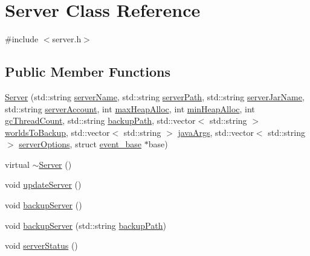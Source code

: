 \hypertarget{class_server}{}\section{Server Class Reference}
\label{class_server}


{\ttfamily \#include $<$server.\+h$>$}

\subsection*{Public Member Functions}
\begin{DoxyCompactItemize}
\item 
\hyperlink{class_server_a8613abefade901e8f3ae2a028ab985f0}{Server} (std\+::string \hyperlink{class_server_aa96465f7e42dc0a43997e80aa002f5dc}{server\+Name}, std\+::string \hyperlink{class_server_a3435a7c091cb1184892e0a8a89838aa8}{server\+Path}, std\+::string \hyperlink{class_server_a00fa649de7a3b16e3884e7f0edb01cbc}{server\+Jar\+Name}, std\+::string \hyperlink{class_server_a1e9675de0f07622b12fa6848bc2d24b2}{server\+Account}, int \hyperlink{class_server_af2edab4046d3ca9525dc117582b1efa5}{max\+Heap\+Alloc}, int \hyperlink{class_server_ab572c4b5477a4dcfdf264e9fcb5b9f82}{min\+Heap\+Alloc}, int \hyperlink{class_server_a3586f498f31d9b52f122b48dff5bebb8}{gc\+Thread\+Count}, std\+::string \hyperlink{class_server_a5519da36a05003e5b724f6c0ae6a80a0}{backup\+Path}, std\+::vector$<$ std\+::string $>$ \hyperlink{class_server_ac0981101c974ac4173f98c3d2b9adc20}{worlds\+To\+Backup}, std\+::vector$<$ std\+::string $>$ \hyperlink{class_server_a97edc18388a8b8c94193dabfdadcf389}{java\+Args}, std\+::vector$<$ std\+::string $>$ \hyperlink{class_server_a955aa6e6e4f11b3809db65a16f16f14e}{server\+Options}, struct \hyperlink{class_server_afd7e0781dcfb8315807e3b173f84d8a9}{event\+\_\+base} $\ast$base)
\item 
virtual \hyperlink{class_server_a4b3aa2579cb1c8cd1d069582c14d0fa6}{$\sim$\+Server} ()
\item 
void \hyperlink{class_server_a1735675f39611edc89fc6363446c393c}{update\+Server} ()
\item 
void \hyperlink{class_server_a1c24b1f9b8b8ac513382ae0e7ba229eb}{backup\+Server} ()
\item 
void \hyperlink{class_server_ab16d98a8889b690225f65aee757b5998}{backup\+Server} (std\+::string \hyperlink{class_server_a5519da36a05003e5b724f6c0ae6a80a0}{backup\+Path})
\item 
void \hyperlink{class_server_aaa084c42dc896c290a30b685305e38e6}{server\+Status} ()

\end{DoxyCompactItemize}
